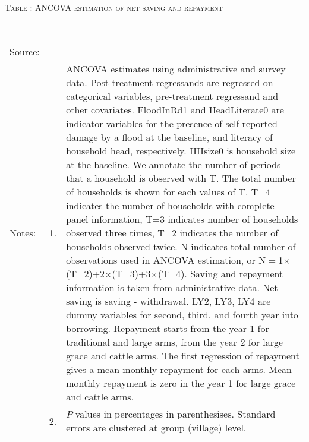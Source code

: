 \hspace{-1cm}\begin{minipage}[t]{14cm}
\hfil\textsc{\normalsize Table \thetable: ANCOVA estimation of net saving and repayment\label{tab ANCOVA Repayment}}\\
\setlength{\tabcolsep}{1pt}
\setlength{\baselineskip}{8pt}
\renewcommand{\arraystretch}{.55}
\hspace{-.75cm}\\
\renewcommand{\arraystretch}{.8}
\setlength{\tabcolsep}{1pt}
\begin{tabular}{>{\hfill\scriptsize}p{1cm}<{}>{\hfill\scriptsize}p{.25cm}<{}>{\scriptsize}p{12cm}<{\hfill}}
Source:& \multicolumn{2}{l}{\scriptsize Estimated with GUK administrative and survey data.}\\
Notes: & 1. & ANCOVA estimates using administrative and survey data. Post treatment regressands are regressed on categorical variables, pre-treatment regressand and other covariates. \textsf{FloodInRd1} and \textsf{HeadLiterate0} are indicator variables for the presence of self reported damage by a flood at the baseline, and literacy of household head, respectively. \textsf{HHsize0} is household size at the baseline. We annotate the number of periods that a household is observed with \textsf{T}. The total number of households is shown for each values of \textsf{T}. \textsf{T=4} indicates the number of households with complete panel information, \textsf{T=3} indicates number of households observed three times, \textsf{T=2} indicates the number of households observed twice. \textsf{N} indicates total number of observations used in ANCOVA estimation, or \textsf{N$=$1$\times$(T=2)+2$\times$(T=3)+3$\times$(T=4)}.  Saving and repayment information is taken from administrative data. Net saving is saving - withdrawal. %
\textsf{LY2, LY3, LY4} are dummy variables for second, third, and fourth year into borrowing.  Repayment starts from the year 1 for \textsf{traditional} and \textsf{large} arms, from the year 2 for \textsf{large grace} and \textsf{cattle} arms. The first regression of repayment gives a mean monthly repayment for each arms. Mean monthly repayment is zero in the year 1 for \textsf{large grace} and \textsf{cattle} arms.\\
& 2. & $P$ values in percentages in parenthesises. Standard errors are clustered at group (village) level.
\end{tabular}
\end{minipage}


